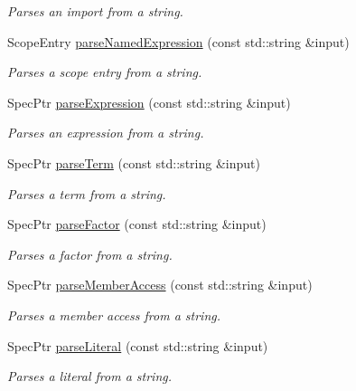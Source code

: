\begin{DoxyCompactItemize}
\begin{DoxyCompactList}\small\item\em Parses an import from a string. \end{DoxyCompactList}\item 
Scope\-Entry \hyperlink{classgiskard__suturo_1_1GiskardPPParser_a204cc6b1dbb4f4c123ae2381c21e1129}{parse\-Named\-Expression} (const std\-::string \&input)
\begin{DoxyCompactList}\small\item\em Parses a scope entry from a string. \end{DoxyCompactList}\item 
Spec\-Ptr \hyperlink{classgiskard__suturo_1_1GiskardPPParser_af682380db5bae7510af5dd770ff6a40a}{parse\-Expression} (const std\-::string \&input)
\begin{DoxyCompactList}\small\item\em Parses an expression from a string. \end{DoxyCompactList}\item 
Spec\-Ptr \hyperlink{classgiskard__suturo_1_1GiskardPPParser_a1cfd0a847425bfc11e5fa3ee44d4f0da}{parse\-Term} (const std\-::string \&input)
\begin{DoxyCompactList}\small\item\em Parses a term from a string. \end{DoxyCompactList}\item 
Spec\-Ptr \hyperlink{classgiskard__suturo_1_1GiskardPPParser_a1ce68109ff8fe2a04781387a5e75d01c}{parse\-Factor} (const std\-::string \&input)
\begin{DoxyCompactList}\small\item\em Parses a factor from a string. \end{DoxyCompactList}\item 
Spec\-Ptr \hyperlink{classgiskard__suturo_1_1GiskardPPParser_abc02fe77f1aa658ce54e295dd81f72fd}{parse\-Member\-Access} (const std\-::string \&input)
\begin{DoxyCompactList}\small\item\em Parses a member access from a string. \end{DoxyCompactList}\item 
Spec\-Ptr \hyperlink{classgiskard__suturo_1_1GiskardPPParser_ad70ef6f3bdfef9a9303ab8ed5bd4fc6a}{parse\-Literal} (const std\-::string \&input)
\begin{DoxyCompactList}\small\item\em Parses a literal from a string. \end{DoxyCompactList}\item 

\end{DoxyCompactItemize}

